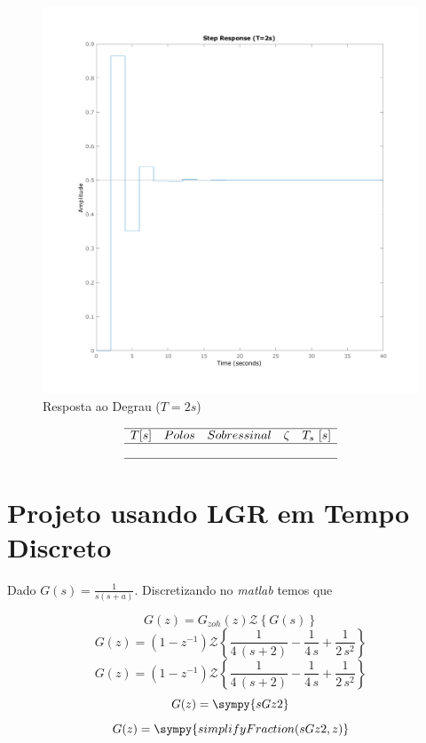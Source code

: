 \documentclass[a4paper,11pt]{article}
\begin{document}
\begin{figure}[H]
    \centering
    \includegraphics[width=0.8\linewidth]{img/exsim3-step-t2000ms.png}
    \caption{ Resposta ao Degrau ($T=2s$)}
\end{figure}


\begin{table}[H]
    $$
    \begin{array}{ccccc}
        \hline
        T [s] & Polos & Sobressinal & \zeta & T_s\ [s] \\
        \hline
        
        \\\hline
    \end{array}
    $$
\end{table}

\subsection{}

\section{Projeto usando LGR em Tempo Discreto}

Dado $G(s) = \frac{1}{s(s+a)}$. Discretizando no \textit{matlab} temos que


$$G(z) = G_{zoh}(z)\mathcal{Z}\left\{G(s)\right\}$$
$$G(z) = (1-z^{-1})\mathcal{Z}\left\{\frac{1}{4\,\left(s+2\right)}-\frac{1}{4\,s}+\frac{1}{2\,s^2}\right\} $$
$$G(z) = (1-z^{-1})\mathcal{Z}\left\{\frac{1}{4\,\left(s+2\right)}-\frac{1}{4\,s}+\frac{1}{2\,s^2}\right\} $$
$$G(z) = \sympy{sGz2}$$
$$G(z) = \sympy{simplifyFraction(sGz2,z)}$$
\end{document}
